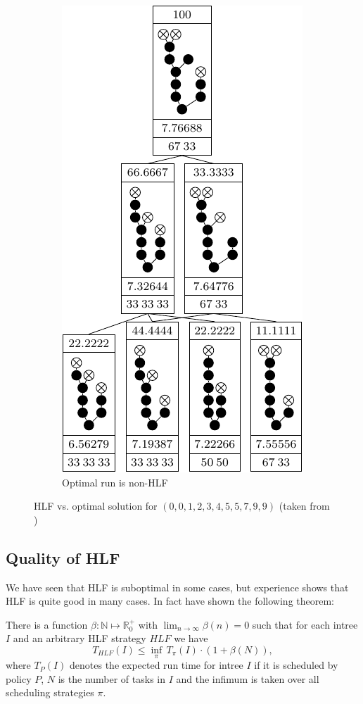 \begin{figure}[ht]
\begin{subfigure}{.45\linewidth}
    \includegraphics{p3/hlf_not_optimal/00123455799_opt.pdf}
    \caption{Optimal run is non-HLF}
  \end{subfigure}
  \caption{HLF vs. optimal solution for $(0,0,1,2,3,4,5,5,7,9,9)$ (taken from \cite{chandyreynoldsshortpaper1975})}
  \label{fig:hlf-vs-opt-00123455799}
\end{figure}

\subsection{Quality of HLF}
\label{sec:suboptimal-hlf-quality}

We have seen that HLF is suboptimal in some cases, but experience shows that HLF is quite good in many cases. In fact \cite{journals/siamcomp/PapadimitriouT87} have shown the following theorem:

\begin{theorem}
  \label{thm:quality-hlf-papadimitriou}
  There is a function $\beta: \mathbb{N} \mapsto \mathbb{R}^+_0$ with $\lim_{n\rightarrow \infty} \beta(n) = 0$ such that for each intree $I$ and an arbitrary HLF strategy $HLF$ we have
  \begin{equation*}
    T_{HLF}(I) \leq \inf_\pi\, T_{\pi}(I) \cdot \left( 1+\beta(N) \right),
  \end{equation*}
  where $T_{P}(I)$ denotes the expected run time for intree $I$ if it is scheduled by policy $P$, $N$ is the number of tasks in $I$ and the infimum is taken over all scheduling strategies $\pi$.
\end{theorem}

